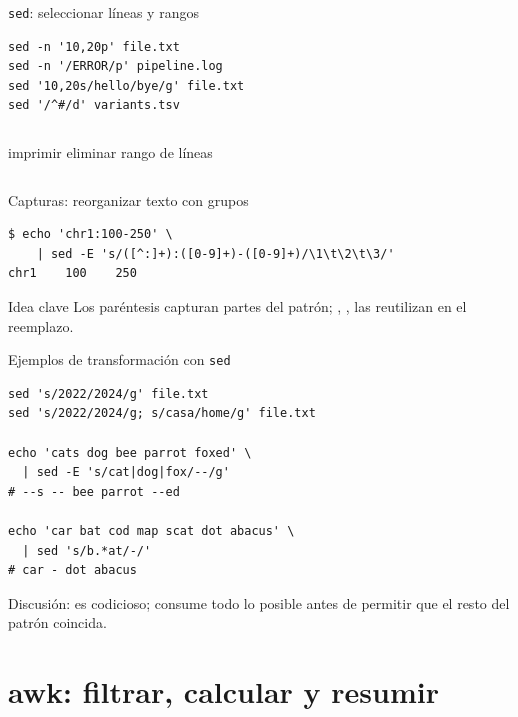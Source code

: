 \documentclass[aspectratio=169,11pt]{beamer}
\begin{document}
\begin{frame}[fragile]{\texttt{sed}: seleccionar líneas y rangos}
\begin{lstlisting}
sed -n '10,20p' file.txt
sed -n '/ERROR/p' pipeline.log
sed '10,20s/hello/bye/g' file.txt
sed '/^#/d' variants.tsv
\end{lstlisting}
  \vspace{4mm}
  \begin{columns}[T,onlytextwidth]
    \quad imprimir
    \quad eliminar
    \quad rango de líneas
  \end{columns}
\end{frame}

\begin{frame}[fragile]{Capturas: reorganizar texto con grupos}
\begin{lstlisting}
$ echo 'chr1:100-250' \
    | sed -E 's/([^:]+):([0-9]+)-([0-9]+)/\1\t\2\t\3/'
chr1    100    250
\end{lstlisting}
  \vspace{5mm}
  \begin{wideblock}{Idea clave}
    Los paréntesis capturan partes del patrón; , ,  las reutilizan en el reemplazo.
  \end{wideblock}
\end{frame}

\begin{frame}[fragile]{Ejemplos de transformación con \texttt{sed}}
\begin{lstlisting}
sed 's/2022/2024/g' file.txt
sed 's/2022/2024/g; s/casa/home/g' file.txt

echo 'cats dog bee parrot foxed' \
  | sed -E 's/cat|dog|fox/--/g'
# --s -- bee parrot --ed

echo 'car bat cod map scat dot abacus' \
  | sed 's/b.*at/-/'
# car - dot abacus
\end{lstlisting}
  \vspace{2mm}
  \small\color{Slate}Discusión:  es codicioso; consume todo lo posible antes de permitir que el resto del patrón coincida.
\end{frame}

\section{awk: filtrar, calcular y resumir}
\end{document}
